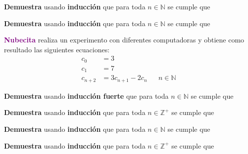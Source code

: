 \documentclass[oneside]{style}
\begin{document}
\begin{questions}[label=\protect\circled{\bfseries\arabic*}]
    \question
    {
        \textbf{Demuestra} usando \textbf{inducción} que para toda 
        $n \in \mathbb{N}$ se cumple que
        \begin{center}
        \end{center}
    }

    \question
    {
        \textbf{Demuestra} usando \textbf{inducción} que para toda 
        $n \in \mathbb{N}$ se cumple que
        \begin{center}
        \end{center}
    }

    \newpage
    \question
    {
        \textcolor{purple}{\textbf{Nubecita}} realiza un experimento con 
        diferentes computadoras y obtiene como resultado las siguientes 
        ecuaciones:
        \begin{align*}
            c_0 &= 3 \\ 
            c_1 &= 7 \\ 
            c_{n+2} &= 3c_{n+1} - 2c_n 
            && n \in \mathbb{N}
        \end{align*}

        \textbf{Demuestra} usando \textbf{inducción fuerte} que para toda 
        $n \in \mathbb{N}$ se cumple que 
        \begin{center}
        \end{center} 
    }

    \question
    {
        \textbf{Demuestra} usando \textbf{inducción} que para toda 
        $n \in \mathbb{Z^+}$ se cumple que
        \begin{center}
        \end{center}
    }

    \question
    {
        \textbf{Demuestra} usando \textbf{inducción} que para toda 
        $n \in \mathbb{N}$ se cumple que
        \begin{center}
        \end{center}
    }

    \question
    {
        \textbf{Demuestra} usando \textbf{inducción} que para toda 
        $n \in \mathbb{Z}^+$ se cumple que
        \begin{center}
        \end{center}
    }


\end{questions}
\end{document}

